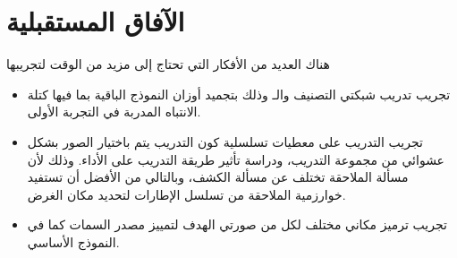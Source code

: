 \section{الآفاق المستقبلية}
هناك العديد من الأفكار التي تحتاج إلى مزيد من الوقت لتجريبها 
\begin{itemize}
	\item
	تجريب تدريب شبكتي التصنيف والـ
	وذلك بتجميد أوزان النموذج الباقية بما فيها كتلة الانتباه المدربة في التجربة الأولى.
	\item
	تجريب التدريب على معطيات تسلسلية كون التدريب يتم باختيار الصور بشكل عشوائي من مجموعة التدريب، ودراسة تأثير طريقة التدريب على الأداء. وذلك لأن مسألة الملاحقة تختلف عن مسألة الكشف، وبالتالي من الأفضل أن تستفيد خوارزمية الملاحقة من تسلسل الإطارات لتحديد مكان الغرض.
	\item
	تجريب ترميز مكاني مختلف لكل من صورتي الهدف لتمييز مصدر السمات كما في النموذج الأساسي.
	
\end{itemize}
	
	
